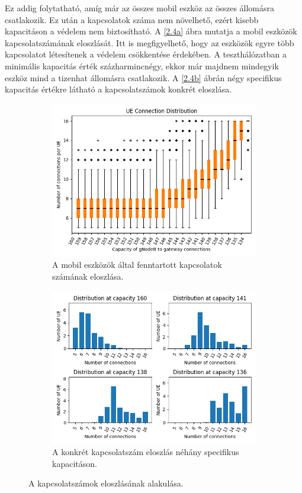 \documentclass[a4paper,oneside]{article}
\begin{document}
Ez addig folytatható, amíg már az összes mobil eszköz az összes állomásra csatlakozik.
Ez után a kapcsolatok száma nem növelhető, ezért kisebb kapacitáson a védelem nem biztosítható.
A \ref{2.4a} ábra mutatja a mobil eszközök kapcsolatszámának eloszlását.
Itt is megfigyelhető, hogy az eszközök egyre több kapcsolatot létesítenek a védelem csökkentése érdekében.
A teszthálózatban a minimális kapacitás érték százharmincnégy,
ekkor már majdnem mindegyik eszköz mind a tizenhat állomásra csatlakozik.
A \ref{2.4b} ábrán négy specifikus kapacitás értékre látható a kapcsolatszámok konkrét eloszlása.

\begin{figure}[h]
  \begin{subfigure}[t]{0.5\textwidth}
    \includegraphics[width=\textwidth]{ue_connection_distribution.png}
    \caption{
      A mobil eszközök által fenntartott kapcsolatok számának eloszlása.
    } \label{fig:2.3a}
  \end{subfigure}
  \begin{subfigure}[t]{0.5\textwidth}
    \includegraphics[width=\textwidth]{specific_distribution.png}
    \caption{
      A konkrét kapcsolatszám eloszlás néhány specifikus kapacitáson.
    } \label{fig:2.3b}
  \end{subfigure}
  \caption{A kapcsolatszámok eloszlásának alakulása.}
  \label{fig:2.4}
\end{figure}
\end{document}

